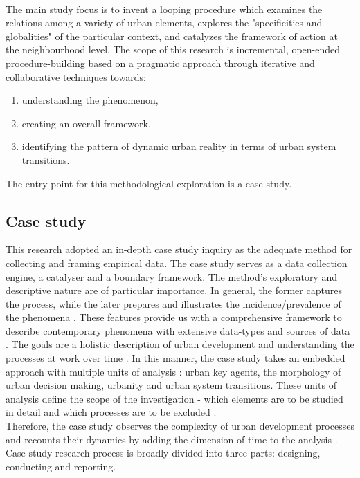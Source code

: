 \documentclass[11pt]{report}
\begin{document}
\\
The main study focus is to invent a looping procedure which examines the relations among a variety of urban elements, explores the "specificities and globalities" of the particular context, and catalyzes the framework of action at the neighbourhood level. The scope of this research is incremental, open-ended procedure-building based on a pragmatic approach through iterative and collaborative techniques towards:
\begin{enumerate}
\item understanding the phenomenon,
\item creating an overall framework,
\item identifying the pattern of dynamic urban reality in terms of urban system transitions. 
\end{enumerate} 

The entry point for this methodological exploration is a case study.

\subsection{Case study}

This research adopted an in-depth case study inquiry as the adequate method for collecting and framing empirical data. The case study serves as a data collection engine, a catalyser and a boundary framework. The method's exploratory and descriptive nature are of particular importance. In general, the former captures the process, while the later prepares and illustrates the incidence/prevalence of the phenomena \cite{(Yin 1994)}. These features provide us with a comprehensive framework to describe contemporary phenomena with extensive data-types and sources of data \cite{(Feagin, Orum and Sjoberg 1999)}. The goals are a holistic description of urban development and understanding the processes at work over time \cite{(Wanborn 2010)}. In this manner, the case study takes an embedded approach with multiple units of analysis \cite{(Scholz and Tietje, 2002; Yin 2009)}: urban key agents, the morphology of urban decision making, urbanity and urban system transitions. These units of analysis define the scope of the investigation - which elements are to be studied in detail and which processes are to be excluded \cite{(Harrison 2002)}.
\\
Therefore, the case study observes the complexity of urban development processes and recounts their dynamics by adding the dimension of time to the analysis \cite{(Feagin et al. 1991)}.
Case study research process is broadly divided into three parts: designing, conducting and reporting. 
\end{document}
